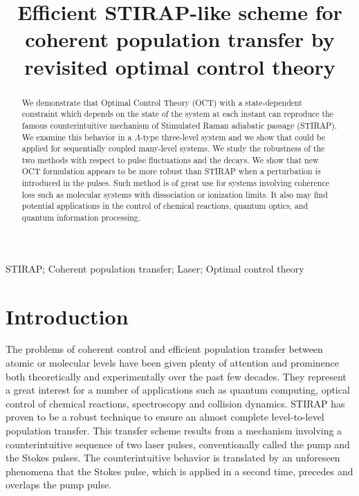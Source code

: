 \documentclass[]{interact}
\theoremstyle{plain}%
\theoremstyle{definition}
\theoremstyle{remark}
\begin{document}
\title{Efficient STIRAP-like scheme for coherent population transfer by 
revisited optimal control theory}
\author{
}
\maketitle
\begin{abstract}
We demonstrate that Optimal Control Theory (OCT) with a state-dependent 
constraint which depends on the state of the system at each instant can 
reproduce the famous counterintuitive mechanism of Stimulated Raman adiabatic 
passage (STIRAP). We examine this behavior in a $\Lambda$-type three-level 
system and we show that could be applied for sequentially coupled many-level 
systems. We study the robustness of the two methods with respect to pulse 
fluctuations and the decays. We show that new OCT formulation appears to be 
more robust than STIRAP when a perturbation is introduced in the pulses. Such 
method is of great use for systems involving coherence loss such as molecular 
systems with dissociation or ionization limits. It also may find potential 
applications in the control of chemical reactions, quantum optics, and quantum 
information processing.
\end{abstract}
\begin{keywords} 
STIRAP; Coherent population transfer; Laser; Optimal control theory 
\end{keywords}
\section{Introduction}
The problems of coherent control and efficient population transfer between 
atomic or molecular levels have been given plenty of attention and prominence 
both theoretically and experimentally \cite{Marlan,Bergmann,Bergmann2,Vitanov, 
Fewell,Fleischhauer,Kobrak,Band,Elk,Schiemann,Jaouadi} over the past few 
decades. 
They represent a great interest for a number of applications such as quantum 
computing, optical control of chemical reactions, spectroscopy and collision 
dynamics.   
STIRAP \cite{Bergmann, Kuklinski} has proven to be a robust technique to ensure 
an almost complete level-to-level
population transfer. This transfer scheme results from a mechanism 
involving a counterintuitive sequence of two laser pulses, 
conventionally called the pump and the Stokes  pulses. The counterintuitive 
behavior is translated by an unforeseen phenomena that the Stokes pulse, 
which is applied in a second time, precedes and overlaps the pump pulse. 
  
\end{document}
